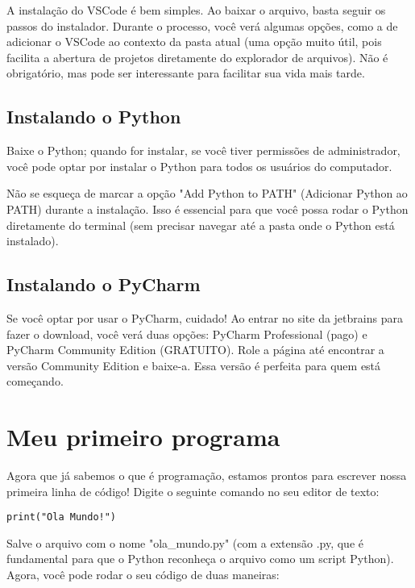\documentclass[12pt]{book}
\begin{document}
	A instalação do VSCode é bem simples. Ao baixar o arquivo, basta seguir os passos do instalador. Durante o processo, você verá algumas opções, como a de adicionar o VSCode ao contexto da pasta atual (uma opção muito útil, pois facilita a abertura de projetos diretamente do explorador de arquivos). Não é obrigatório, mas pode ser interessante para facilitar sua vida mais tarde.
	
	\subsection{Instalando o Python}
	
	Baixe o Python; quando for instalar, se você tiver permissões de administrador, você pode optar por instalar o Python para todos os usuários do computador.
	
	\begin{tcolorbox}[colback=gray!10, colframe=black, title={\large\bfseries Importante}]
	Não se esqueça de marcar a opção "Add Python to PATH" (Adicionar Python ao PATH) durante a instalação. Isso é essencial para que você possa rodar o Python diretamente do terminal (sem precisar navegar até a pasta onde o Python está instalado).
	\end{tcolorbox}
	\subsection{Instalando o PyCharm}
	
	Se você optar por usar o PyCharm, cuidado! Ao entrar no site da jetbrains para fazer o download, você verá duas opções: PyCharm Professional (pago) e PyCharm Community Edition (GRATUITO). Role a página até encontrar a versão Community Edition e baixe-a. Essa versão é perfeita para quem está começando.
	
	\section{Meu primeiro programa}
	
	Agora que já sabemos o que é programação, estamos prontos para escrever nossa primeira linha de código! Digite o seguinte comando no seu editor de texto:
	
	\begin{lstlisting}[caption={Olá mundo em python}] 
print("Ola Mundo!")\end{lstlisting}
	
	
	Salve o arquivo com o nome "ola\_mundo.py" (com a extensão .py, que é fundamental para que o Python reconheça o arquivo como um script Python). Agora, você pode rodar o seu código de duas maneiras:
	
\end{document}
